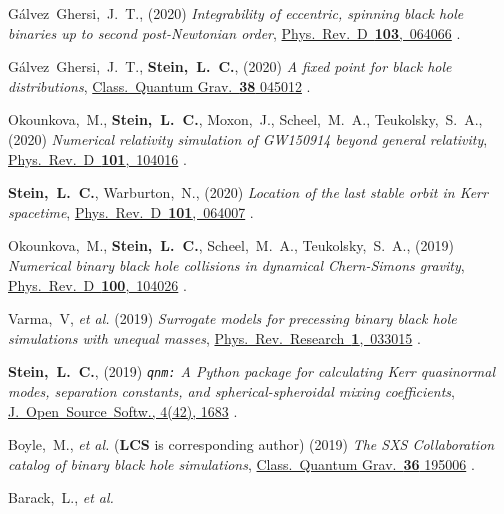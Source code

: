 \begin{etaremune}[start=\value{pubCounter}]
  Gálvez~Ghersi,~J.~T.,
  (2020)
  {\it Integrability of eccentric, spinning black hole binaries up to second post-Newtonian order},
  \href{https://doi.org/10.1103/PhysRevD.103.064066}%
  {Phys.~Rev.~D~{\bf 103},~064066}
  .
\item
  Gálvez~Ghersi,~J.~T.,
  {\bf Stein,~L.~C.},
  (2020)
  {\it A fixed point for black hole distributions},
  \href{https://doi.org/10.1088/1361-6382/abcfd2}
  {Class.~Quantum Grav.~{\bf 38} 045012}
  .
\item
  Okounkova,~M.,
  {\bf Stein,~L.~C.},
  Moxon,~J.,
  Scheel,~M.~A.,
  Teukolsky,~S.~A.,
  (2020)
  {\it Numerical relativity simulation of GW150914 beyond general relativity},
  \href{https://doi.org/10.1103/PhysRevD.101.104016}{Phys.~Rev.~D~{\bf 101},~104016}
  .
\item
  {\bf Stein,~L.~C.},
  Warburton,~N.,
  (2020)
  {\it Location of the last stable orbit in Kerr spacetime},
  \href{https://doi.org/10.1103/PhysRevD.101.064007}{Phys.~Rev.~D~{\bf 101},~064007}
  .
\item
  Okounkova,~M.,
  {\bf Stein,~L.~C.},
  Scheel,~M.~A.,
  Teukolsky,~S.~A.,
  (2019)
  {\it Numerical binary black hole collisions in dynamical Chern-Simons gravity},
  \href{https://doi.org/10.1103/PhysRevD.100.104026}{Phys.~Rev.~D~{\bf 100},~104026}
  .
\item
  Varma,~V, {\it et al.}
  (2019)
  {\it Surrogate models for precessing binary black hole simulations with
  unequal masses},
  \href{https://doi.org/10.1103/PhysRevResearch.1.033015}{Phys.~Rev.~Research~{\bf 1},~033015}
  .
\item
  {\bf Stein,~L.~C.},
  (2019)
  \hspace{0.1em}
  {\it {\tt qnm:} A Python package for calculating Kerr quasinormal modes, separation constants, and spherical-spheroidal mixing coefficients},
  \href{https://doi.org/10.21105/joss.01683}{J.~Open~Source~Softw., 4(42), 1683}
  .
\item
  Boyle,~M., {\it et al.} ({\bf LCS} is corresponding author)
  (2019)
  {\it The SXS Collaboration catalog of binary black hole simulations},
  \href{https://doi.org/10.1088/1361-6382/ab34e2}{Class.~Quantum Grav.~{\bf 36} 195006}
  .
\item
  Barack,~L., {\it et al.}

\end{etaremune}
